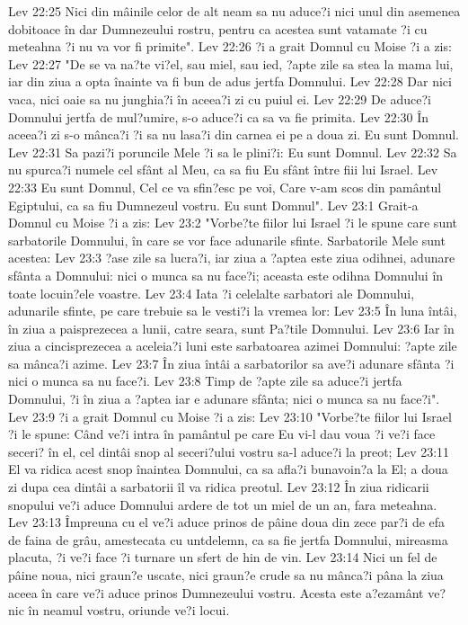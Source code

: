 Lev 22:25  Nici din mâinile celor de alt neam sa nu aduce?i nici unul din asemenea dobitoace în dar Dumnezeului rostru, pentru ca acestea sunt vatamate ?i cu meteahna ?i nu va vor fi primite".
Lev 22:26  ?i a grait Domnul cu Moise ?i a zis:
Lev 22:27  "De se va na?te vi?el, sau miel, sau ied, ?apte zile sa stea la mama lui, iar din ziua a opta înainte va fi bun de adus jertfa Domnului.
Lev 22:28  Dar nici vaca, nici oaie sa nu junghia?i în aceea?i zi cu puiul ei.
Lev 22:29  De aduce?i Domnului jertfa de mul?umire, s-o aduce?i ca sa va fie primita.
Lev 22:30  În aceea?i zi s-o mânca?i ?i sa nu lasa?i din carnea ei pe a doua zi. Eu sunt Domnul.
Lev 22:31  Sa pazi?i poruncile Mele ?i sa le plini?i: Eu sunt Domnul.
Lev 22:32  Sa nu spurca?i numele cel sfânt al Meu, ca sa fiu Eu sfânt între fiii lui Israel.
Lev 22:33  Eu sunt Domnul, Cel ce va sfin?esc pe voi, Care v-am scos din pamântul Egiptului, ca sa fiu Dumnezeul vostru. Eu sunt Domnul".
Lev 23:1  Grait-a Domnul cu Moise ?i a zis:
Lev 23:2  "Vorbe?te fiilor lui Israel ?i le spune care sunt sarbatorile Domnului, în care se vor face adunarile sfinte. Sarbatorile Mele sunt acestea:
Lev 23:3  ?ase zile sa lucra?i, iar ziua a ?aptea este ziua odihnei, adunare sfânta a Domnului: nici o munca sa nu face?i; aceasta este odihna Domnului în toate locuin?ele voastre.
Lev 23:4  Iata ?i celelalte sarbatori ale Domnului, adunarile sfinte, pe care trebuie sa le vesti?i la vremea lor:
Lev 23:5  În luna întâi, în ziua a paisprezecea a lunii, catre seara, sunt Pa?tile Domnului.
Lev 23:6  Iar în ziua a cincisprezecea a aceleia?i luni este sarbatoarea azimei Domnului: ?apte zile sa mânca?i azime.
Lev 23:7  În ziua întâi a sarbatorilor sa ave?i adunare sfânta ?i nici o munca sa nu face?i.
Lev 23:8  Timp de ?apte zile sa aduce?i jertfa Domnului, ?i în ziua a ?aptea iar e adunare sfânta; nici o munca sa nu face?i".
Lev 23:9  ?i a grait Domnul cu Moise ?i a zis:
Lev 23:10  "Vorbe?te fiilor lui Israel ?i le spune: Când ve?i intra în pamântul pe care Eu vi-l dau voua ?i ve?i face seceri? în el, cel dintâi snop al seceri?ului vostru sa-l aduce?i la preot;
Lev 23:11  El va ridica acest snop înaintea Domnului, ca sa afla?i bunavoin?a la El; a doua zi dupa cea dintâi a sarbatorii îl va ridica preotul.
Lev 23:12  În ziua ridicarii snopului ve?i aduce Domnului ardere de tot un miel de un an, fara meteahna.
Lev 23:13  Împreuna cu el ve?i aduce prinos de pâine doua din zece par?i de efa de faina de grâu, amestecata cu untdelemn, ca sa fie jertfa Domnului, mireasma placuta, ?i ve?i face ?i turnare un sfert de hin de vin.
Lev 23:14  Nici un fel de pâine noua, nici graun?e uscate, nici graun?e crude sa nu mânca?i pâna la ziua aceea în care ve?i aduce prinos Dumnezeului vostru. Acesta este a?ezamânt ve?nic în neamul vostru, oriunde ve?i locui.
